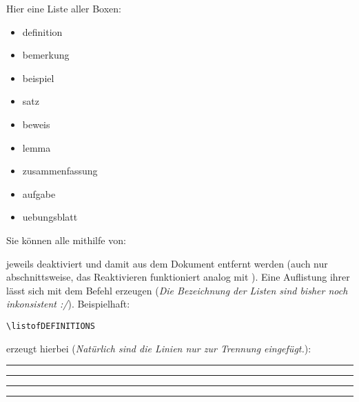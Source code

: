Hier eine Liste aller Boxen:
\begin{multicols}{3}
    \begin{itemize}[label=$\diamond$]\narrowitems
        \item definition
        \item bemerkung
        \item beispiel
        \item satz
        \item beweis
        \item lemma
        \item zusammenfassung
        \item aufgabe
        \item uebungsblatt
    \end{itemize}
\end{multicols}
Sie können alle mithilfe von:
jeweils deaktiviert und damit aus dem Dokument entfernt werden (auch nur abschnittsweise, das Reaktivieren funktioniert analog mit ). \newline
Eine Auflistung ihrer lässt sich mit dem  Befehl erzeugen (\textit{Die Bezeichnung der Listen sind bisher noch inkonsistent :/}). Beispielhaft:
\begin{lstlisting}[language=lLatex]
\listofDEFINITIONS
\end{lstlisting}
erzeugt hierbei (\textit{Natürlich sind die Linien nur zur Trennung eingefügt.}):\clearpage
{}
\rule{\linewidth}{1.2pt}\vspace{-0.75\baselineskip}
\rule{\linewidth}{0.6pt}\vspace*{-1.5cm}
\listofDEFINITIONS
\rule{\linewidth}{0.6pt}\vspace{-0.7\baselineskip}
\rule{\linewidth}{1.2pt}

\newcommand{\printmark}[2][Linkname]{\ensuremath{\text{#1}^{\rightarrow~\text{\pageref{#2}}}}}





